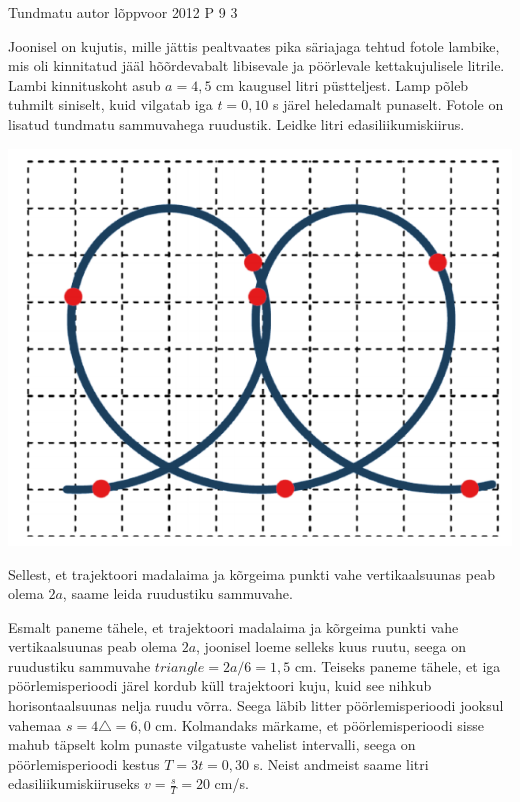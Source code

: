 {Tundmatu autor} %
{lõppvoor} %
{2012} %
{P 9} %
{3} %
{

\ifStatement
Joonisel on kujutis, mille jättis pealtvaates pika säriajaga tehtud fotole lambike, mis oli kinnitatud jääl hõõrdevabalt libisevale ja pöörlevale kettakujulisele litrile. Lambi kinnituskoht asub $a = 4,5$ cm kaugusel litri püstteljest. Lamp põleb tuhmilt siniselt, kuid vilgatab  iga $t = 0,10$ s järel heledamalt punaselt. Fotole on lisatud tundmatu sammuvahega ruudustik. Leidke litri edasiliikumiskiirus.
\begin{center}
	\includegraphics[width=0.5\linewidth]{2012-v3p-09-yl.PNG}
\end{center}
\fi

\ifHint
Sellest, et trajektoori madalaima ja kõrgeima punkti vahe vertikaalsuunas peab olema $2a$, saame leida ruudustiku sammuvahe.
\fi

\ifSolution
Esmalt paneme tähele, et trajektoori madalaima ja kõrgeima punkti vahe vertikaalsuunas peab olema $2a$, joonisel loeme selleks kuus ruutu, seega on ruudustiku sammuvahe $triangle = 2a/6 = 1,5$ cm. Teiseks paneme tähele, et iga pöörlemisperioodi järel kordub küll trajektoori kuju, kuid see nihkub horisontaalsuunas nelja ruudu võrra. Seega läbib litter pöörlemisperioodi jooksul vahemaa $s = 4\triangle = 6,0$ cm. Kolmandaks märkame, et pöörlemisperioodi sisse mahub täpselt kolm punaste vilgatuste vahelist intervalli, seega on pöörlemisperioodi kestus $T = 3t = 0,30$ s. Neist andmeist saame litri edasiliikumiskiiruseks $v = \frac{s}{T} = 20$ cm/s.
\fi
}
